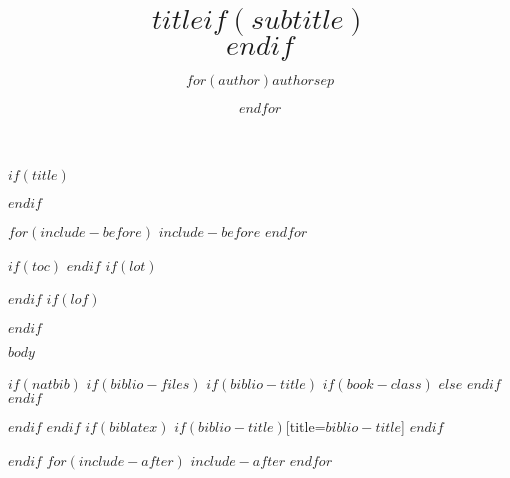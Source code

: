\documentclass[$if(doctype)$$doctype$,$else$man,$endif$$if(natbib)$natbib,$endif$$for(classoption)$$classoption$$sep$,$endfor$]{apa6}
\title{$title$$if(subtitle)$\\\vspace{0.5em}{\large $subtitle$}$endif$}
\author{$for(author)$$author$$sep$ \and $endfor$}
\affiliation{$affiliation$}
\begin{document}
$if(title)$
\maketitle
$endif$
\raggedbottom

$for(include-before)$
$include-before$
$endfor$

$if(toc)$
{
\hypersetup{linkcolor=black}
\setcounter{tocdepth}{$toc-depth$}
\tableofcontents
}
$endif$
$if(lot)$
\listoftables
$endif$
$if(lof)$
\listoffigures
$endif$

$body$

$if(natbib)$
$if(biblio-files)$
$if(biblio-title)$
$if(book-class)$
\renewcommand\bibname{$biblio-title$}
$else$
\renewcommand\refname{$biblio-title$}
$endif$
$endif$


$endif$
$endif$
$if(biblatex)$
\printbibliography$if(biblio-title)$[title=$biblio-title$]
$endif$

$endif$
$for(include-after)$
$include-after$
$endfor$
\end{document}
